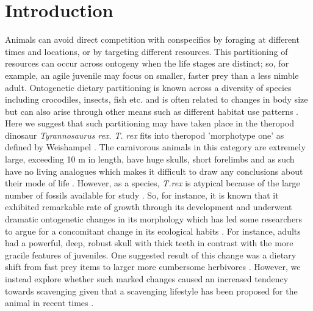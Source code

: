 \newpage

\section{\uppercase{I}ntroduction}

Animals can avoid direct competition with conspecifics by foraging at different times and locations, or by targeting different resources. This partitioning of resources can occur across ontogeny when the life stages are distinct; so, for example, an agile juvenile may focus on smaller, faster prey than a less nimble adult. Ontogenetic dietary partitioning is known across a diversity of species including crocodiles, insects, fish etc. \citep{platt2006food,winemiller1989ontogenetic,steyn1980breeding,hirai2002ontogenetic,knoff2008ontogenetic} and is often related to changes in body size \citep{woodward2002body} but can also arise through other means such as different habitat use patterns \citep{carrier2010sharks}.
Here we suggest that such partitioning may have taken place in the theropod dinosaur \textit{Tyrannosaurus rex}. \textit{T. rex} fits into theropod 'morphotype one' as defined by Weishampel \citep{weishampel2004dinosauria}. The carnivorous animals in this category are extremely large, exceeding 10 m in length, have huge skulls, short forelimbs and as such have no living analogues which makes it difficult to draw any conclusions about their mode of life \citep{weishampel2004dinosauria}. 
However, as a species, \textit{T.rex} is atypical because of the large number of fossils available for study \citep{brusatte2010tyrannosaur}. So, for instance, it is known that it exhibited remarkable rate of growth through its development \citep{brusatte2010tyrannosaur} and underwent dramatic ontogenetic changes in its morphology which has led some researchers to argue for a concomitant change in its ecological habits \citep{brusatte2010tyrannosaur}. For instance, adults had a powerful, deep, robust skull with thick teeth in contrast with the more gracile features of juveniles. One suggested result of this change was a dietary shift from fast prey items to larger more cumbersome herbivores \citep{brusatte2010tyrannosaur}. However, we instead explore whether such marked changes caused an increased tendency towards scavenging given that a scavenging lifestyle has been proposed for the animal in recent times \citep{horner1993complete, ruxton2004obligate}. \\
